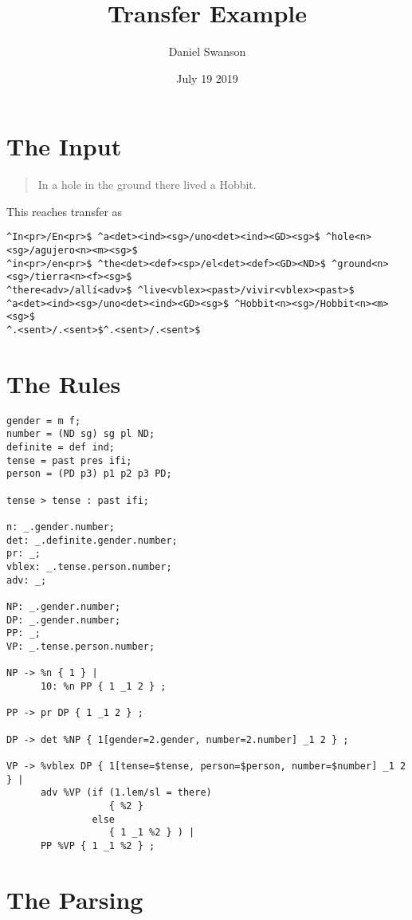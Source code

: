 \documentclass{article}
\title{Transfer Example}
\author{Daniel Swanson}
\date{July 19 2019}
\begin{document}
\maketitle

\section{The Input}

\begin{quote}
    In a hole in the ground there lived a Hobbit.
\end{quote}

This reaches transfer as

\begin{verbatim}
^In<pr>/En<pr>$ ^a<det><ind><sg>/uno<det><ind><GD><sg>$ ^hole<n><sg>/agujero<n><m><sg>$
^in<pr>/en<pr>$ ^the<det><def><sp>/el<det><def><GD><ND>$ ^ground<n><sg>/tierra<n><f><sg>$
^there<adv>/allí<adv>$ ^live<vblex><past>/vivir<vblex><past>$ 
^a<det><ind><sg>/uno<det><ind><GD><sg>$ ^Hobbit<n><sg>/Hobbit<n><m><sg>$
^.<sent>/.<sent>$^.<sent>/.<sent>$
\end{verbatim}

\clearpage
\section{The Rules}

\begin{verbatim}
gender = m f;
number = (ND sg) sg pl ND;
definite = def ind;
tense = past pres ifi;
person = (PD p3) p1 p2 p3 PD;

tense > tense : past ifi;

n: _.gender.number;
det: _.definite.gender.number;
pr: _;
vblex: _.tense.person.number;
adv: _;

NP: _.gender.number;
DP: _.gender.number;
PP: _;
VP: _.tense.person.number;

NP -> %n { 1 } |
      10: %n PP { 1 _1 2 } ;

PP -> pr DP { 1 _1 2 } ;

DP -> det %NP { 1[gender=2.gender, number=2.number] _1 2 } ;

VP -> %vblex DP { 1[tense=$tense, person=$person, number=$number] _1 2 } |
      adv %VP (if (1.lem/sl = there) 
                  { %2 }
               else
                  { 1 _1 %2 } ) |
      PP %VP { 1 _1 %2 } ;
\end{verbatim}

\clearpage
\section{The Parsing}
\end{document}
